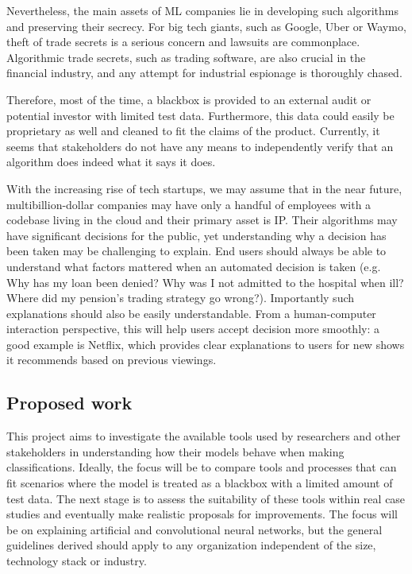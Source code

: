 \documentclass[proposal]{softeng}
\begin{document}
    Nevertheless, the main assets of ML companies lie in developing such algorithms and preserving their secrecy. For big tech giants, such as Google, Uber or Waymo, theft of trade secrets is a serious concern and lawsuits are commonplace\cite{stealuber,waymo}. Algorithmic trade secrets, such as trading software, are also crucial in the financial industry, and any attempt for industrial espionage is thoroughly chased\cite{jeopardy}.

    Therefore, most of the time, a blackbox is provided to an external audit or potential investor with limited test data. Furthermore, this data could easily be proprietary as well and cleaned to fit the claims of the product. Currently, it seems that stakeholders do not have any means to independently verify that an algorithm does indeed what it says it does.

    With the increasing rise of tech startups, we may assume that in the near future, multibillion-dollar companies may have only a handful of employees with a codebase living in the cloud and their primary asset is IP. Their algorithms may have significant decisions for the public, yet understanding why a decision has been taken may be challenging to explain. End users should always be able to understand what factors mattered when an automated decision is taken (e.g. Why has my loan been denied? Why was I not admitted to the hospital when ill? Where did my pension's trading strategy go wrong?). Importantly such explanations should also be easily understandable. From a human-computer interaction perspective, this will help users accept decision more smoothly: a good example is Netflix, which provides clear explanations to users for new shows it recommends based on previous viewings.

    \subsection{Proposed work}

    This project aims to investigate the available tools used by researchers and other stakeholders in understanding how their models behave when making classifications. Ideally, the focus will be to compare tools and processes that can fit scenarios where the model is treated as a blackbox with a limited amount of test data. The next stage is to assess the suitability of these tools within real case studies and eventually make realistic proposals for improvements. The focus will be on explaining artificial and convolutional neural networks, but the general guidelines derived should apply to any organization independent of the size, technology stack or industry.
\end{document}
